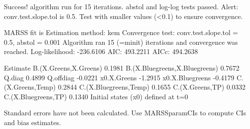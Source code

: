 \begin{Schunk}
\begin{Soutput}
Success! algorithm run for 15 iterations. abstol and log-log tests passed.
Alert: conv.test.slope.tol is 0.5.
Test with smaller values (<0.1) to ensure convergence.

MARSS fit is
Estimation method: kem 
Convergence test: conv.test.slope.tol = 0.5, abstol = 0.001
Algorithm ran 15 (=minit) iterations and convergence was reached. 
Log-likelihood: -236.6106 
AIC: 493.2211   AICc: 494.2638   
 
                              Estimate
B.(X.Greens,X.Greens)           0.1981
B.(X.Bluegreens,X.Bluegreens)   0.7672
Q.diag                          0.4899
Q.offdiag                      -0.0221
x0.X.Greens                    -1.2915
x0.X.Bluegreens                -0.4179
C.(X.Greens,Temp)               0.2844
C.(X.Bluegreens,Temp)           0.1655
C.(X.Greens,TP)                 0.0332
C.(X.Bluegreens,TP)             0.1340
Initial states (x0) defined at t=0

Standard errors have not been calculated. 
Use MARSSparamCIs to compute CIs and bias estimates.
\end{Soutput}
\end{Schunk}
